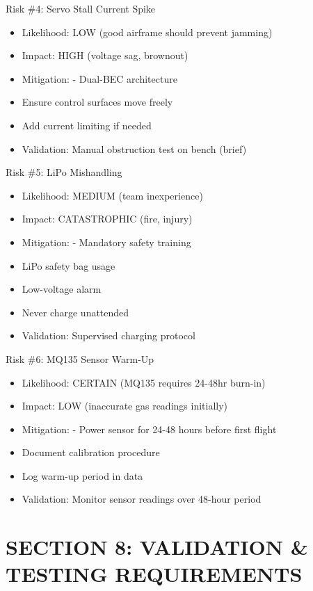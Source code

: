 \documentclass[11pt,letterpaper]{article}
\begin{document}
Risk \#4: Servo Stall Current Spike\par

\begin{itemize}
  \item Likelihood:   LOW (good airframe should prevent jamming)
  \item Impact:       HIGH (voltage sag, brownout)
  \item Mitigation:   - Dual-BEC architecture
  \item Ensure control surfaces move freely
  \item Add current limiting if needed
  \item Validation:   Manual obstruction test on bench (brief)
\end{itemize}

Risk \#5: LiPo Mishandling\par

\begin{itemize}
  \item Likelihood:   MEDIUM (team inexperience)
  \item Impact:       CATASTROPHIC (fire, injury)
  \item Mitigation:   - Mandatory safety training
  \item LiPo safety bag usage
  \item Low-voltage alarm
  \item Never charge unattended
  \item Validation:   Supervised charging protocol
\end{itemize}

Risk \#6: MQ135 Sensor Warm-Up\par

\begin{itemize}
  \item Likelihood:   CERTAIN (MQ135 requires 24-48hr burn-in)
  \item Impact:       LOW (inaccurate gas readings initially)
  \item Mitigation:   - Power sensor for 24-48 hours before first flight
  \item Document calibration procedure
  \item Log warm-up period in data
  \item Validation:   Monitor sensor readings over 48-hour period
\end{itemize}

\section{SECTION 8: VALIDATION \& TESTING REQUIREMENTS}
\end{document}
